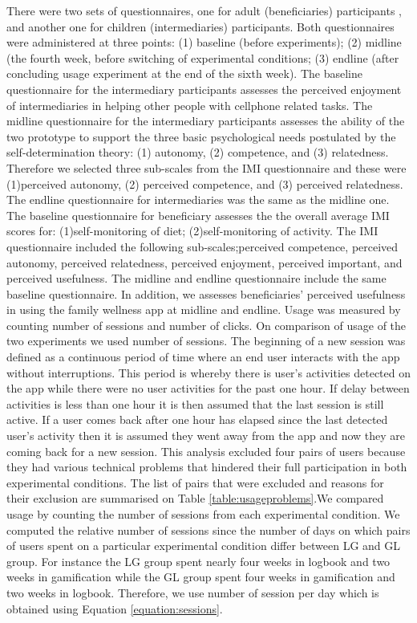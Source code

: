 \documentclass{sig-alternate}
\begin{document}
There were two sets of questionnaires, one for adult (beneficiaries) participants , and another one for children (intermediaries)  participants. Both questionnaires were administered at three points: (1) baseline (before experiments); (2) midline (the fourth week, before switching of experimental conditions; (3) endline (after concluding usage experiment at the end of the sixth week).\newline
The baseline questionnaire for the intermediary participants assesses the perceived enjoyment of intermediaries in helping other people with cellphone related tasks. The midline questionnaire for the intermediary participants assesses the ability of the two prototype to support the three basic psychological needs postulated by the self-determination theory: (1) autonomy, (2) competence, and (3) relatedness. Therefore we selected three sub-scales from the IMI questionnaire and these were (1)perceived autonomy, (2) perceived competence, and (3) perceived relatedness. The endline questionnaire for intermediaries was the same as the midline one.\newline
The baseline questionnaire for beneficiary assesses the the overall average IMI scores for: (1)self-monitoring of diet; (2)self-monitoring of activity. The IMI questionnaire included the following sub-scales;perceived competence, perceived autonomy, perceived relatedness, perceived enjoyment, perceived important, and perceived usefulness. The midline and endline questionnaire include the same baseline questionnaire. In addition, we assesses beneficiaries' perceived usefulness in using the family wellness app at midline and endline.\newline
Usage was measured by counting number of sessions and number of clicks. On comparison of usage of the two experiments we used number of sessions. The beginning of a new session was defined as a continuous period of time where an end user interacts with the app without interruptions. This period is whereby there is user's activities detected on the app while there were no user activities for the past one hour. If delay between activities is less than one hour it is then assumed that the last session is still active. If a user comes back after one hour has elapsed since the last detected user's activity then it is assumed they went away from the app and now they are coming back for a new session. 
This analysis excluded four pairs of users because they had various technical problems that hindered their full participation in both experimental conditions. The list of pairs that were excluded and reasons for their exclusion are summarised on Table \ref{table:usageproblems}.We compared usage by counting the number of sessions from each experimental condition. We computed the relative number of sessions since the number of days on which pairs of users spent on a particular experimental condition differ between LG and GL group. For instance the LG group spent nearly four weeks in logbook and two weeks in gamification while the GL group spent four weeks in gamification and two weeks in logbook. Therefore, we use number of session per day which is obtained using Equation \ref{equation:sessions}.\newline
\end{document}
